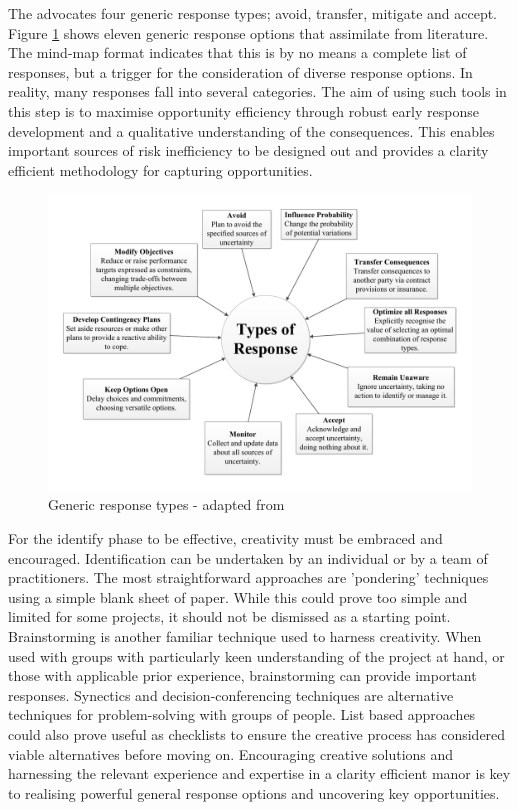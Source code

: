 The \citet{pmi2013} advocates four generic response types; avoid, transfer, mitigate and accept.
Figure \ref{Figure:ResponseTypes} shows eleven generic response options that \citet{chapman} assimilate from literature.
The mind-map format indicates that this is by no means a complete list of responses, but a trigger for the consideration of diverse response options.
In reality, many responses fall into several categories.
The aim of using such tools in this step is to maximise opportunity efficiency through robust early response development and a qualitative understanding of the consequences. 
This enables important sources of risk inefficiency to be designed out and provides a clarity efficient methodology for capturing opportunities.

\begin{figure}[!h]
  \centering
    \includegraphics[width = \textwidth]{./Figures/ResponseTypes.pdf} 
\caption{Generic response types - adapted from \cite{chapman}}
\label{Figure:ResponseTypes}
\end{figure}

For the identify phase to be effective, creativity must be embraced and encouraged.
Identification can be undertaken by an individual or by a team of practitioners.
The most straightforward approaches are 'pondering' techniques using a simple blank sheet of paper.
While this could prove too simple and limited for some projects, it should not be dismissed as a starting point.
Brainstorming is another familiar technique used to harness creativity.
When used with groups with particularly keen understanding of the project at hand, or those with applicable prior experience, brainstorming can provide important responses.
Synectics \citep{gordon1961synectics} and decision-conferencing techniques \citep{finlay1991review} are alternative techniques for problem-solving with groups of people.
List based approaches could also prove useful as checklists to ensure the creative process has considered viable alternatives before moving on.
Encouraging creative solutions and harnessing the relevant experience and expertise in a clarity efficient manor is key to realising powerful general response options and uncovering key opportunities.


